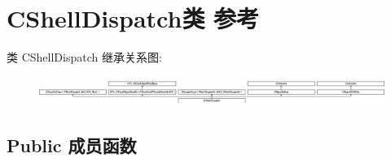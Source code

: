 \hypertarget{class_c_shell_dispatch}{}\section{C\+Shell\+Dispatch类 参考}
\label{class_c_shell_dispatch}
类 C\+Shell\+Dispatch 继承关系图\+:\begin{figure}[H]
\begin{center}
\leavevmode
\includegraphics[height=0.954545cm]{class_c_shell_dispatch}
\end{center}
\end{figure}
\subsection*{Public 成员函数}
